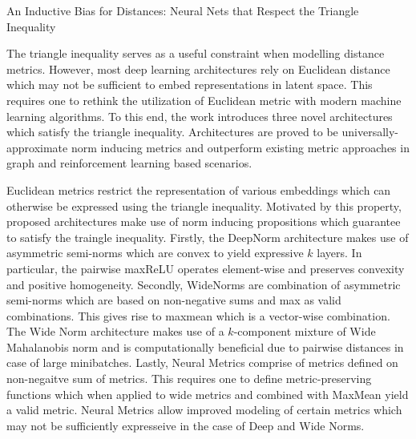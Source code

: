\documentclass[11pt,letterpaper]{article}
\begin{document}
\begin{center}
  \large{An Inductive Bias for Distances: Neural Nets that Respect the Triangle Inequality}
\end{center}

The triangle inequality serves as a useful constraint when modelling distance metrics. However, most deep learning architectures rely on Euclidean distance which may not be sufficient to embed representations in latent space. This requires one to rethink the utilization of Euclidean metric with modern machine learning algorithms. To this end, the work introduces three novel architectures which satisfy the triangle inequality. Architectures are proved to be universally-approximate norm inducing metrics and outperform existing metric approaches in graph and reinforcement learning based scenarios. 

Euclidean metrics restrict the representation of various embeddings which can otherwise be expressed using the triangle inequality. Motivated by this property, proposed architectures make use of norm inducing propositions which guarantee to satisfy the traingle inequality. Firstly, the DeepNorm architecture makes use of asymmetric semi-norms which are convex to yield expressive $k$ layers. In particular, the pairwise maxReLU operates element-wise and preserves convexity and positive homogeneity. Secondly, WideNorms are combination of asymmetric semi-norms which are based on non-negative sums and max as valid combinations. This gives rise to maxmean which is a vector-wise combination. The Wide Norm architecture makes use of a $k$-component mixture of Wide Mahalanobis norm and is computationally beneficial due to pairwise distances in case of large minibatches. Lastly, Neural Metrics comprise of metrics defined on non-negaitve sum of metrics. This requires one to define metric-preserving functions which when applied to wide metrics and combined with MaxMean yield a valid metric. Neural Metrics allow improved modeling of certain metrics which may not be sufficiently expresseive in the case of Deep and Wide Norms. 
\end{document}
